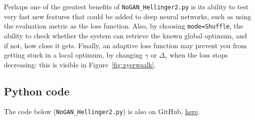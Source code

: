 \documentclass[oneside,10pt]{book}
\begin{document}
Perhaps one of the greatest benefits of  \texttt{NoGAN\_Hellinger2.py} is its ability to test very fast new features that could be added to
 deep neural networks, such as using the evaluation metric as the loss function. Also, by choosing
\texttt{mode=\textquotesingle Shuffle\textquotesingle}, the ability to check whether the system can retrieve the known global optimum, and if not, how close it gets.
Finally, an adaptive loss function may prevent you  from getting stuck in a local optimum, by changing $\gamma$ or $\Delta_\tau$
when the loss stops decreasing: this is visible in Figure~\ref{fig:xyerwsalk}. 





\subsection{Python code}\label{ferment}
 

The code below (\texttt{NoGAN\_Hellinger2.py}) is also on GitHub, \href{https://github.com/VincentGranville/Main/blob/main/NoGAN_Hellinger2.py}{here}.
\vspace{1ex}
\end{document}
